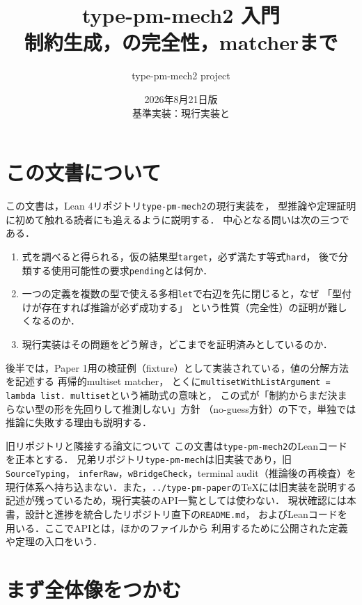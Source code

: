 \documentclass[11pt,a4paper,oneside]{ltjsbook}
\title{\Huge type-pm-mech2 入門\\[4mm]
  \Large 制約生成，\code{let}の完全性，matcherまで}
\author{type-pm-mech2 project}
\date{2026年8月21日版\\
  基準実装：現行\code{type-pm-mech2}実装と\code{README.md}}
\newcommand{\code}[1]{\texttt{#1}}
\begin{document}
\frontmatter
\maketitle

\chapter*{この文書について}

この文書は，Lean 4リポジトリ\code{type-pm-mech2}の現行実装を，
型推論や定理証明に初めて触れる読者にも追えるように説明する．
中心となる問いは次の三つである．

\begin{enumerate}[leftmargin=2em]
  \item 式を調べると得られる，仮の結果型\code{target}，必ず満たす等式\code{hard}，
        後で分類する使用可能性の要求\code{pending}とは何か．
  \item 一つの定義を複数の型で使える多相\code{let}で右辺を先に閉じると，なぜ
        「型付けが存在すれば推論が必ず成功する」
        という性質（完全性）の証明が難しくなるのか．
  \item 現行実装はその問題をどう解き，どこまでを証明済みとしているのか．
\end{enumerate}

後半では，Paper 1用の検証例（fixture）として実装されている，値の分解方法を記述する
再帰的multiset matcher，
とくに\code{multisetWithListArgument = lambda list. multiset}という補助式の意味と，
この式が「制約からまだ決まらない型の形を先回りして推測しない」方針
（no-guess方針）の下で，単独では推論に失敗する理由も説明する．

\begin{warningbox}{旧リポジトリと隣接する論文について}
この文書は\code{type-pm-mech2}のLeanコードを正本とする．
兄弟リポジトリ\code{type-pm-mech}は旧実装であり，旧\code{SourceTyping}，
\code{inferRaw}，\code{wBridgeCheck}，terminal audit（推論後の再検査）を
現行体系へ持ち込まない．また，\code{../type-pm-paper}のTeXには旧実装を説明する
記述が残っているため，現行実装のAPI一覧としては使わない．
現状確認には本書，設計と進捗を統合したリポジトリ直下の\code{README.md}，
およびLeanコードを用いる．ここでAPIとは，ほかのファイルから
利用するために公開された定義や定理の入口をいう．
\end{warningbox}

\tableofcontents

\mainmatter

\chapter{まず全体像をつかむ}
\end{document}
